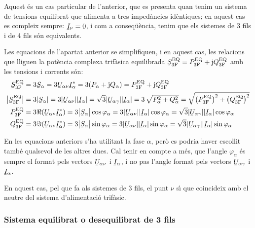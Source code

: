 Aquest \'{e}s un cas particular de l'anterior, que es presenta quan
tenim un sistema de tensions equilibrat que alimenta a tres
imped\`{a}ncies id\`{e}ntiques; en aquest cas es compleix sempre:
$\cmplx{I}_\nu=0$, i com a conseq\"{u}\`{e}ncia, tenim que els sistemes de 3
fils i de 4 fils s\'{o}n equivalents.

Les equacions de l'apartat anterior se simplifiquen, i en aquest
cas, les relacions que lliguen la  pot\`{e}ncia complexa trif\`{a}sica
equilibrada $\cmplx{S}\ped{3F}\ap{EQ} = P\ped{3F}\ap{EQ} + \ju
Q\ped{3F}\ap{EQ}$ amb les tensions i corrents s\'{o}n:
\begin{align}
    \cmplx{S}\ped{3F}\ap{EQ} &= 3\cmplx{S}_\alpha = 3\cmplx{U}_{\alpha\nu} \cmplx{I}_\alpha^* =
    3 (P_\alpha + \ju Q_\alpha) = P\ped{3F}\ap{EQ} +\ju Q\ped{3F}\ap{EQ} \label{eq:s_3f_eq}\\
    \big|\cmplx{S}\ped{3F}\ap{EQ}\big| &= 3|\cmplx{S}_\alpha | =   3 |\cmplx{U}_{\alpha\nu}| |\cmplx{I}_\alpha| =
    \sqrt{3} |\cmplx{U}_{\alpha\gamma}| |\cmplx{I}_\alpha| = 3\,\sqrt{P_\alpha^2 + Q_\alpha^2} =
    \sqrt{\big(P\ped{3F}\ap{EQ}\big)^2 + \big(Q\ped{3F}\ap{EQ}\big)^2} \\
    P\ped{3F}\ap{EQ} &= 3\Re(\cmplx{U}_{\alpha\nu} \cmplx{I}_\alpha^*) =
    3\big|\cmplx{S}_\alpha\big| \cos \varphi_\alpha = 3 |\cmplx{U}_{\alpha\nu}|
    |\cmplx{I}_\alpha|\label{eq:p_3f_34}
    \cos \varphi_\alpha = \sqrt{3} |\cmplx{U}_{\alpha\gamma}||\cmplx{I}_\alpha| \cos \varphi_\alpha \\
    Q\ped{3F}\ap{EQ} &= 3\Im(\cmplx{U}_{\alpha\nu} \cmplx{I}_\alpha^*) =
    3\big|\cmplx{S}_\alpha\big|  \sin \varphi_\alpha = 3 |\cmplx{U}_{\alpha\nu}| |\cmplx{I}_\alpha|\label{eq:q_3f_34}
    \sin\varphi_\alpha=\sqrt{3} |\cmplx{U}_{\alpha\gamma}||\cmplx{I}_\alpha|\sin \varphi_\alpha
\end{align}

En les equacions anteriors s'ha utilitzat la fase $\alpha$, per\`{o} es
podria haver escollit tamb\'{e} qualsevol de les altres dues. Cal tenir
en compte a m\'{e}s, que l'angle $\varphi_\alpha$ \'{e}s sempre el format
pels vectors $\cmplx{U}_{\alpha\nu}$ i $\cmplx{I}_\alpha$, i no pas
l'angle format pels vectors $\cmplx{U}_{\alpha\gamma}$ i
$\cmplx{I}_\alpha$.

En aquest cas, pel que fa als sistemes de 3 fils,  el punt $\nu$ s\'{\i}
que coincideix amb el neutre del sistema d'alimentaci\'{o} trif\`{a}sic.

\subsubsection{Sistema equilibrat o desequilibrat de 3 fils}

